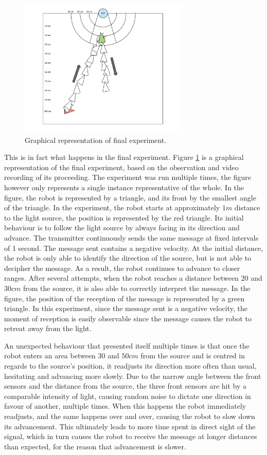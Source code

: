 \begin{figure}[hbt]
\centering
  \includegraphics[height=250px]{img/experiment2}
  \caption{Graphical representation of final experiment.}
  \label{fig:experiment}
\end{figure}

This is in fact what happens in the final experiment.
Figure \ref{fig:experiment} is a graphical representation of the final experiment, based on the observation and video recording of its proceeding.
The experiment was run multiple times, the figure however only represents a single instance representative of the whole.
In the figure, the robot is represented by a triangle, and its front by the smallest angle of the triangle.
In the experiment, the robot starts at approximately $1 m$ distance to the light source, the position is represented by the red triangle.
Its initial behaviour is to follow the light source by always facing in its direction and advance.
The transmitter continuously sends the same message at fixed intervals of 1 second.
The message sent contains a negative velocity.
At the initial distance, the robot is only able to identify the direction of the source, but is not able to decipher the message.
As a result, the robot continues to advance to closer ranges.
After several attempts, when the robot reaches a distance between $20$ and $30 cm$ from the source, it is also able to correctly interpret the message.
In the figure, the position of the reception of the message is represented by a green triangle.
In this experiment, since the message sent is a negative velocity, the moment of reception is easily observable since the message causes the robot to retreat away from the light.

An unexpected behaviour that presented itself multiple times is that once the robot enters an area between $30$ and $50 cm$ from the source and is centred in regards to the source's position, it readjusts its direction more often than usual, hesitating and advancing more slowly.
Due to the narrow angle between the front sensors and the distance from the source, the three front sensors are hit by a comparable intensity of light, causing random noise to dictate one direction in favour of another, multiple times.
When this happens the robot immediately readjusts, and the same happens over and over, causing the robot to slow down its advancement.
This ultimately leads to more time spent in direct sight of the signal, which in turn causes the robot to receive the message at longer distances than expected, for the reason that advancement is slower.










